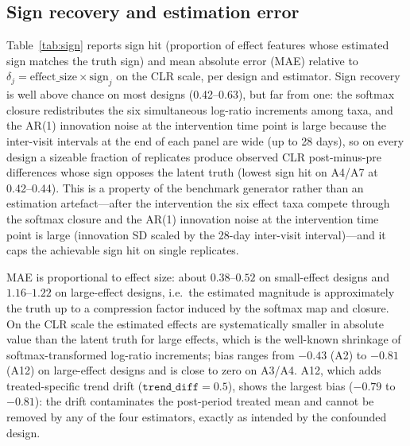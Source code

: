 \documentclass[11pt]{article}
\begin{document}
\subsection{Sign recovery and estimation error}\label{sec:signbias}

Table~\ref{tab:sign} reports sign hit (proportion of effect features whose estimated sign matches
the truth sign) and mean absolute error (MAE) relative to $\delta_j=\mathrm{effect\_size}\times
\mathrm{sign}_j$ on the CLR scale, per design and estimator. Sign recovery is well above chance on
most designs (0.42--0.63), but far from one: the softmax closure redistributes the six simultaneous log-ratio increments among taxa, and the AR(1) innovation noise at the intervention time point is large because the inter-visit intervals at the end of each panel are wide (up to 28 days), so on every design a sizeable fraction of replicates produce observed CLR post-minus-pre differences whose sign opposes the latent truth (lowest sign hit on A4/A7 at 0.42--0.44). This is a
property of the benchmark generator rather than an estimation artefact---after the intervention the
six effect taxa compete through the softmax closure and the AR(1) innovation noise at the
intervention time point is large (innovation SD scaled by the 28-day inter-visit interval)---and it
caps the achievable sign hit on single replicates.

MAE is proportional to effect size: about $0.38$--$0.52$ on small-effect designs and
$1.16$--$1.22$ on large-effect designs, i.e.\ the estimated magnitude is approximately the truth up
to a compression factor induced by the softmax map and closure. On the CLR scale the estimated
effects are systematically smaller in absolute value than the latent truth for large effects, which
is the well-known shrinkage of softmax-transformed log-ratio increments; bias ranges
from $-0.43$ (A2) to $-0.81$ (A12) on large-effect designs and is close to zero on A3/A4. A12, which
adds treated-specific trend drift ($\texttt{trend\_diff}=0.5$), shows the largest bias
($-0.79$ to $-0.81$): the drift contaminates the post-period treated mean and cannot be removed by
any of the four estimators, exactly as intended by the confounded design.
\end{document}
